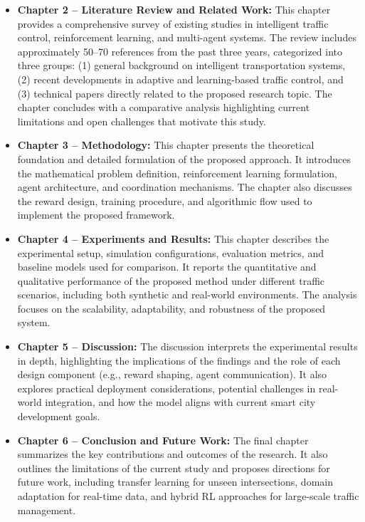 \documentclass[12pt]{report} %
\begin{document}
\begin{itemize}
    \item \textbf{Chapter 2 – Literature Review and Related Work:}  
    This chapter provides a comprehensive survey of existing studies in intelligent traffic control, reinforcement learning, and multi-agent systems. The review includes approximately 50–70 references from the past three years, categorized into three groups: (1) general background on intelligent transportation systems, (2) recent developments in adaptive and learning-based traffic control, and (3) technical papers directly related to the proposed research topic. The chapter concludes with a comparative analysis highlighting current limitations and open challenges that motivate this study.

    \item \textbf{Chapter 3 – Methodology:}  
    This chapter presents the theoretical foundation and detailed formulation of the proposed approach. It introduces the mathematical problem definition, reinforcement learning formulation, agent architecture, and coordination mechanisms. The chapter also discusses the reward design, training procedure, and algorithmic flow used to implement the proposed framework.

    \item \textbf{Chapter 4 – Experiments and Results:}  
    This chapter describes the experimental setup, simulation configurations, evaluation metrics, and baseline models used for comparison. It reports the quantitative and qualitative performance of the proposed method under different traffic scenarios, including both synthetic and real-world environments. The analysis focuses on the scalability, adaptability, and robustness of the proposed system.

    \item \textbf{Chapter 5 – Discussion:}  
    The discussion interprets the experimental results in depth, highlighting the implications of the findings and the role of each design component (e.g., reward shaping, agent communication). It also explores practical deployment considerations, potential challenges in real-world integration, and how the model aligns with current smart city development goals.

    \item \textbf{Chapter 6 – Conclusion and Future Work:}  
    The final chapter summarizes the key contributions and outcomes of the research. It also outlines the limitations of the current study and proposes directions for future work, including transfer learning for unseen intersections, domain adaptation for real-time data, and hybrid RL approaches for large-scale traffic management.
\end{itemize}
\end{document}
